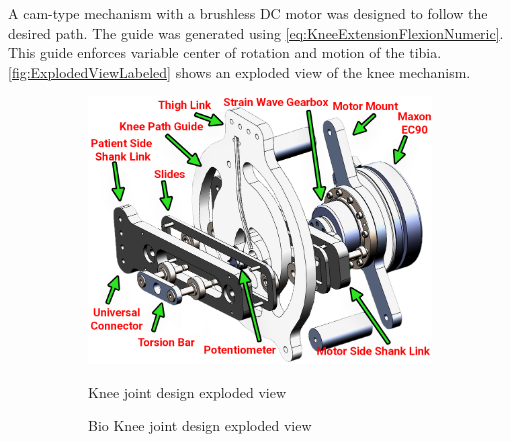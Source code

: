 A cam-type mechanism with a brushless DC motor was designed to follow the desired path. The guide was generated using \autoref{eq:KneeExtensionFlexionNumeric}. This guide enforces variable center of rotation and motion of the tibia. \autoref{fig:ExplodedViewLabeled} shows an exploded view of the knee mechanism. 



\begin{figure}
    \begin{subfigure}{\textwidth}
        \centering
        \captionsetup{justification=centering}
        \includegraphics[scale=0.2]{images/mech_design/ExoKneeExplodedView.png}
        \caption{Bio Knee joint design exploded view}{Knee joint design exploded view}
        \label{fig:ExplodedViewLabeled}
    \end{subfigure}
    \begin{subfigure}{\textwidth}
        \centering

\end{subfigure}
\end{figure}
